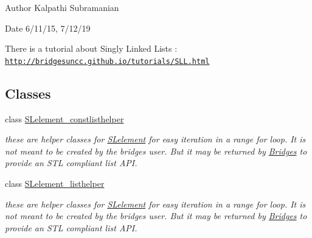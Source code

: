 \begin{DoxyAuthor}{Author}
Kalpathi Subramanian 
\end{DoxyAuthor}
\begin{DoxyDate}{Date}
6/11/15, 7/12/19
\end{DoxyDate}
There is a tutorial about Singly Linked Lists \+: \href{http://bridgesuncc.github.io/tutorials/SLL.html}{\tt http\+://bridgesuncc.\+github.\+io/tutorials/\+S\+L\+L.\+html} \subsection*{Classes}
\begin{DoxyCompactItemize}
\item 
class \hyperlink{classbridges_1_1datastructure_1_1_s_lelement_1_1_s_lelement__constlisthelper}{S\+Lelement\+\_\+constlisthelper}
\begin{DoxyCompactList}\small\item\em these are helper classes for \hyperlink{classbridges_1_1datastructure_1_1_s_lelement}{S\+Lelement} for easy iteration in a range for loop. It is not meant to be created by the bridges user. But it may be returned by \hyperlink{classbridges_1_1_bridges}{Bridges} to provide an S\+TL compliant list A\+PI. \end{DoxyCompactList}\item 
class \hyperlink{classbridges_1_1datastructure_1_1_s_lelement_1_1_s_lelement__listhelper}{S\+Lelement\+\_\+listhelper}
\begin{DoxyCompactList}\small\item\em these are helper classes for \hyperlink{classbridges_1_1datastructure_1_1_s_lelement}{S\+Lelement} for easy iteration in a range for loop. It is not meant to be created by the bridges user. But it may be returned by \hyperlink{classbridges_1_1_bridges}{Bridges} to provide an S\+TL compliant list A\+PI. \end{DoxyCompactList}\end{DoxyCompactItemize}

